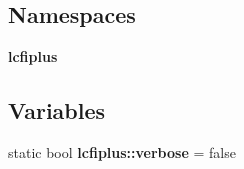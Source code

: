 \subsection*{Namespaces}
\begin{DoxyCompactItemize}
\item 
{\bf lcfiplus}
\end{DoxyCompactItemize}
\subsection*{Variables}
\begin{DoxyCompactItemize}
\item 
static bool {\bf lcfiplus\-::verbose} = false
\end{DoxyCompactItemize}
